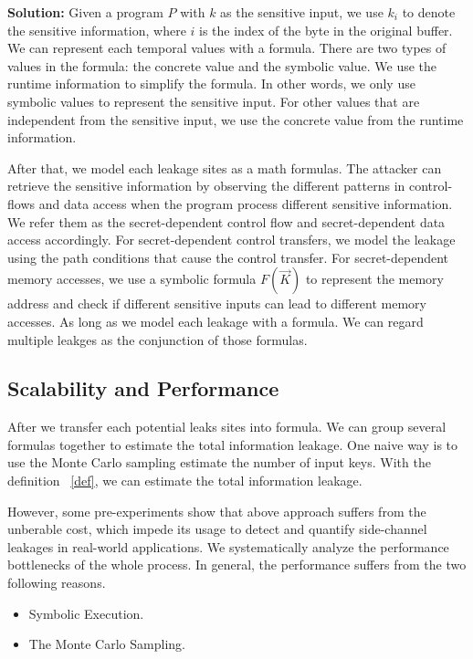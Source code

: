 \textbf{Solution: }Given a program $P$ with $k$ as the sensitive input, 
we use $k_i$ to denote the sensitive information, where $i$ is the index of the byte in the original buffer.  
We can represent each temporal
values with a formula. There are two types of values in the formula: the concrete value and
the symbolic value. We use the runtime information to simplify the formula. In other words,
we only use symbolic values to represent the sensitive input. For other values that are
independent from the sensitive input, we use the concrete value from the runtime information. 

After that, we model each leakage sites as a math formulas.
The attacker can retrieve the sensitive information by observing the different patterns in 
control-flows and data access when the program process different sensitive information. 
We refer them as the secret-dependent control flow and secret-dependent data access accordingly.
For secret-dependent control transfers, we model the leakage using the path conditions that cause the control
transfer. For secret-dependent memory accesses, we use a symbolic formula $F(\vec{K})$ to
represent the memory address and check if different sensitive inputs can lead to different
memory accesses. As long as we model each leakage with a formula. We can regard multiple leakges as the conjunction of
those formulas. 

\subsection{Scalability and Performance}

After we transfer each potential leaks sites into formula. We can group several formulas together
to estimate the total information leakage. One naive way is to use the Monte Carlo sampling  estimate the
number of input keys. With the definition ~\ref{def}, we can estimate the total information leakage.

However, some pre-experiments show that above approach suffers from the unberable cost, which impede its usage
to detect and quantify side-channel leakages in real-world applications. 
We systematically analyze the performance bottlenecks of the whole process. In general, the performance suffers
from the two following reasons. 
\begin{itemize}
    \item Symbolic Execution. 
    \item The Monte Carlo Sampling.
\end{itemize}
